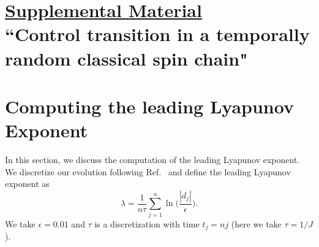 \documentclass[twocolumn,amsmath,amssymb,floatfix,superscriptaddress,aps,prl]{revtex4-2}
\begin{document}
{\clearpage
\onecolumngrid
\section{\underline{Supplemental Material}\\ ``Control transition in a temporally random classical spin chain"}


\setcounter{equation}{0}
\setcounter{figure}{0}
\renewcommand{\theequation}{S\arabic{equation}}
\renewcommand{\thefigure}{S\arabic{figure}}





\section{Computing the leading Lyapunov Exponent}
%
In this section, we discuss the computation of the leading Lyapunov exponent. 
We discretize our evolution following Ref.~\cite{benettin1976kolmogorov} and define the leading Lyapunov exponent as
\begin{equation}
\lambda = \frac{1}{n\tau} \sum_{j=1}^{n}\ln\bigg(\frac{|d_j|}{\epsilon} \bigg). 
\label{eq:lambda}
\end{equation}
We take $\epsilon=0.01$ and $\tau$ is a discretization with time $t_j=nj$ (here we take $\tau=1/J$). 

}
\end{document}
